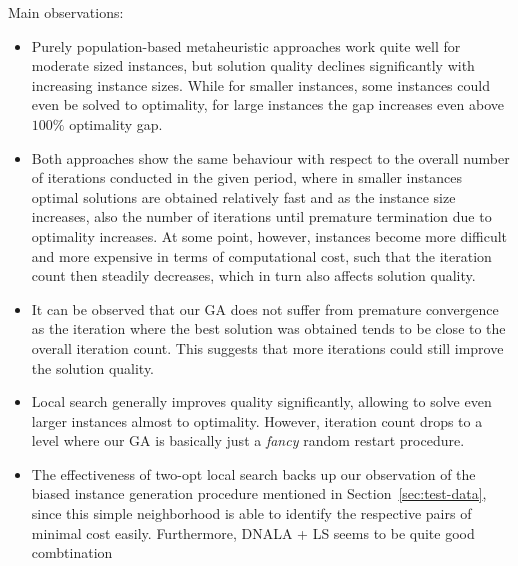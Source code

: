 \documentclass[12pt]{article}
\begin{document}
Main observations:
\begin{itemize}
	\item Purely population-based metaheuristic approaches work quite well for moderate sized instances, but solution quality declines significantly with increasing instance sizes. While for smaller instances, some instances could even be solved to optimality, for large instances the gap increases even above $100\%$ optimality gap. 
	\item Both approaches show the same behaviour with respect to the overall number of iterations conducted in the given period, where in smaller instances optimal solutions are obtained relatively fast and as the instance size increases, also the number of iterations until premature termination due to optimality increases. At some point, however, instances become more difficult and more expensive in terms of computational cost, such that the iteration count then steadily decreases, which in turn also affects solution quality. 
	\item It can be observed that our GA does not suffer from premature convergence as the iteration where the best solution was obtained tends to be close to the overall iteration count. This suggests that more iterations could still improve the solution quality. 
	\item Local search generally improves quality significantly, allowing to solve even larger instances almost to optimality. However, iteration count drops to a level where our GA is basically just a \emph{fancy} random restart procedure. 
	\item The effectiveness of two-opt local search	backs up our observation of the biased instance generation procedure mentioned in Section~\ref{sec:test-data}, since this simple neighborhood is able to identify the respective pairs of minimal cost easily. Furthermore, DNALA + LS seems to be quite good combtination 
\end{itemize}
\end{document}
